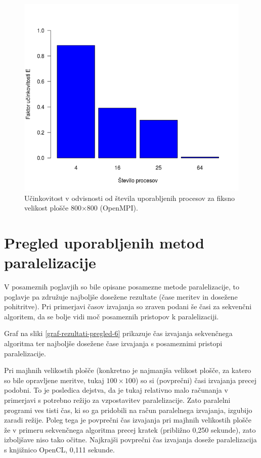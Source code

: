 \documentclass[a4paper,titlepage,11pt]{article}
\begin{document}
\begin{figure}[H]
\begin{center}
\includegraphics[scale=0.5]{graf-rezultati-5_3.png}
\caption{Učinkovitost v odvisnosti od števila uporabljenih procesov za fiksno velikost plošče 800$\times$800 (OpenMPI).}
\label{graf-rezultati-ucinkovitost-5}
\end{center}
\vspace{-25pt}
\end{figure}

\section{Pregled uporabljenih metod paralelizacije}

V posameznih poglavjih so bile opisane posamezne metode paralelizacije, to poglavje pa združuje najboljše dosežene rezultate (čase meritev in dosežene pohitritve). Pri primerjavi časov izvajanja so zraven podani še časi za sekvenčni algoritem, da se bolje vidi moč posameznih pristopov k paralelizaciji.

Graf na sliki \ref{graf-rezultati-pregled-6} prikazuje čas izvajanja sekvenčnega algoritma ter najboljše dosežene čase izvajanja s posameznimi pristopi paralelizacije.

Pri majhnih velikostih plošče (konkretno je najmanjša velikost plošče, za katero so bile opravljene meritve, tukaj $100 \times 100$) so si (povprečni) časi izvajanja precej podobni. To je posledica dejstva, da je tukaj relativno malo računanja v primerjavi s potrebno režijo za vzpostavitev paralelizacije. Zato paralelni programi ves tisti čas, ki so ga pridobili na račun paralelnega izvajanja, izgubijo zaradi režije. Poleg tega je povprečni čas izvajanja pri majhnih velikostih plošče že v primeru sekvenčnega algoritma precej kratek (približno 0,250 sekunde), zato izboljšave niso tako očitne. Najkrajši povprečni čas izvajanja doseže paralelizacija s knjižnico OpenCL, 0,111 sekunde.
\end{document}
